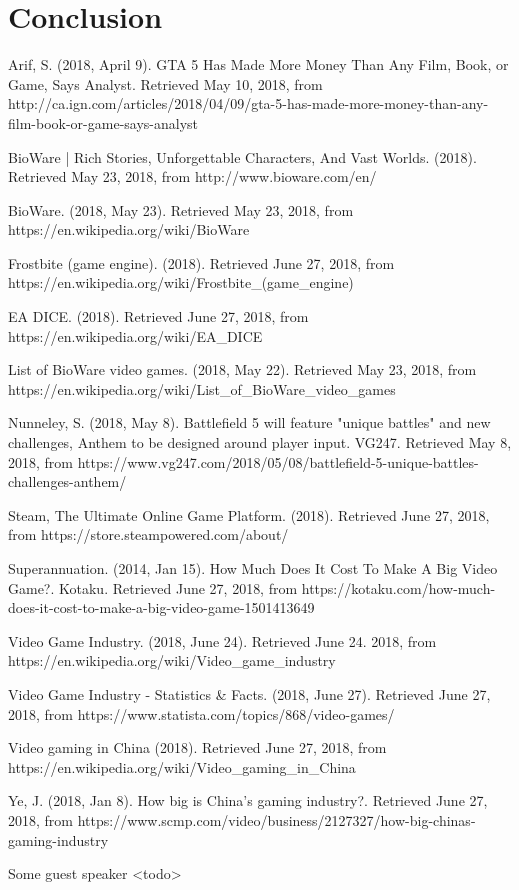 \documentclass[10pt,letterpaper]{article}
\begin{document}
\section*{Conclusion}\label{conclusion}

\begin{thebibliography}{}
	
	Arif, S. (2018, April 9). GTA 5 Has Made More Money Than Any Film, Book, or Game, Says Analyst. Retrieved May 10, 2018, from http://ca.ign.com/articles/2018/04/09/gta-5-has-made-more-money-than-any-film-book-or-game-says-analyst

	BioWare | Rich Stories, Unforgettable Characters, And Vast Worlds. (2018). Retrieved May 23, 2018, from http://www.bioware.com/en/

	BioWare. (2018, May 23). Retrieved May 23, 2018, from https://en.wikipedia.org/wiki/BioWare

	Frostbite (game engine). (2018). Retrieved June 27, 2018, from https://en.wikipedia.org/wiki/Frostbite\_(game\_engine)

	EA DICE. (2018). Retrieved June 27, 2018, from https://en.wikipedia.org/wiki/EA\_DICE

	List of BioWare video games. (2018, May 22). Retrieved May 23, 2018, from https://en.wikipedia.org/wiki/List\_of\_BioWare\_video\_games

	Nunneley, S. (2018, May 8). Battlefield 5 will feature "unique battles" and new challenges, Anthem to be designed around player input. VG247. Retrieved May 8, 2018, from https://www.vg247.com/2018/05/08/battlefield-5-unique-battles-challenges-anthem/

	Steam, The Ultimate Online Game Platform. (2018). Retrieved June 27, 2018, from https://store.steampowered.com/about/

	Superannuation. (2014, Jan 15). How Much Does It Cost To Make A Big Video Game?. Kotaku. Retrieved June 27, 2018, from https://kotaku.com/how-much-does-it-cost-to-make-a-big-video-game-1501413649

	Video Game Industry. (2018, June 24). Retrieved June 24. 2018, from https://en.wikipedia.org/wiki/Video\_game\_industry

	Video Game Industry - Statistics \& Facts. (2018, June 27). Retrieved June 27, 2018, from https://www.statista.com/topics/868/video-games/

	Video gaming in China (2018). Retrieved June 27, 2018, from https://en.wikipedia.org/wiki/Video\_gaming\_in\_China

	Ye, J. (2018, Jan 8). How big is China's gaming industry?. Retrieved June 27, 2018, from https://www.scmp.com/video/business/2127327/how-big-chinas-gaming-industry

	Some guest speaker <todo>

\end{thebibliography}
\end{document}
